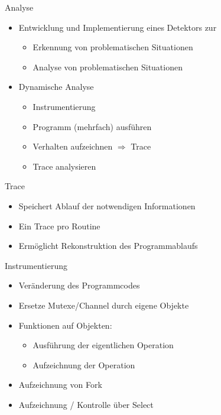 \documentclass[aspectratio=169]{beamer}  %
\begin{document}
\begin{frame}{Analyse}
  \begin{itemize}
    \item Entwicklung und Implementierung eines Detektors zur
    \begin{itemize}
      \item Erkennung von problematischen Situationen
      \item Analyse von problematischen Situationen 
    \end{itemize}
    \item<2> Dynamische Analyse
    \begin{itemize}
      \item<2> Instrumentierung
      \item<2> Programm (mehrfach) ausführen
      \item<2> Verhalten aufzeichnen $\Rightarrow$ Trace
      \item<2> Trace analysieren
    \end{itemize}
  \end{itemize}  
\end{frame}


\begin{frame}{Trace}
  \begin{itemize}
    \item Speichert Ablauf der notwendigen Informationen
    \item Ein Trace pro Routine
    \item Ermöglicht Rekonstruktion des Programmablaufs
  \end{itemize}
\end{frame}



\begin{frame}{Instrumentierung}
  \begin{itemize}
    \item Veränderung des Programmcodes
    \item Ersetze Mutexe/Channel durch eigene Objekte
    \item Funktionen auf Objekten:
    \begin{itemize}
      \item Ausführung der eigentlichen Operation
      \item Aufzeichnung der Operation
    \end{itemize}
    \item Aufzeichnung von Fork
    \item Aufzeichnung / Kontrolle über Select
  \end{itemize}
\end{frame}
\end{document}
